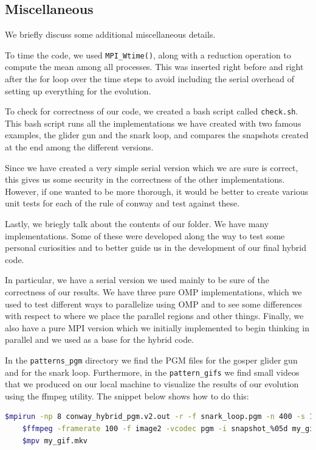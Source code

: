 \documentclass{report}
\begin{document}
\subsection{Miscellaneous}

We briefly discuss some additional miscellaneous details. 

To time the code, we used \texttt{MPI\_Wtime()}, along with a reduction 
operation to compute the mean among all processes. This was inserted right 
before and right after the for loop over the time steps to avoid including the 
serial overhead of setting up everything for the evolution. 

To check for correctness of our code, we created a bash script called 
\texttt{check.sh}. This bash script runs all the implementations we have created 
with two famous examples, the glider gun and the snark loop, and compares the 
snapshots created at the end among the different versions. 

Since we have created a very simple serial version which we are sure is correct, 
this gives us some security in the correctness of the other implementations. 
However, if one wanted to be more thorough, it would be better to create various 
unit tests for each of the rule of conway and test against these.

Lastly, we briegly talk about the contents of our folder. We have many implementations.
Some of these were developed along the way to test some personal curiosities and 
to better guide us in the development of our final hybrid code. 

In particular, we have a serial version we used mainly to be sure of the correctness 
of our results. We have three pure OMP implementations, which we used to test 
different ways to parallelize using OMP and to see some differences with respect 
to where we place the parallel regions and other things. Finally, we also have a 
pure MPI version which we initially implemented to begin thinking in parallel and 
we used as a base for the hybrid code. 

In the \texttt{patterns\_pgm} directory we find the PGM files for the gosper glider gun and 
for the snark loop. Furthermore, in the \texttt{pattern\_gifs} we find small videos 
that we produced on our local machine to visualize the results of our evolution 
using the ffmpeg utility. The snippet below shows how to do this: 

\begin{lstlisting}[language=bash]
    $mpirun -np 8 conway_hybrid_pgm.v2.out -r -f snark_loop.pgm -n 400 -s 1 -e 1 
    $ffmpeg -framerate 100 -f image2 -vcodec pgm -i snapshot_%05d my_gif.mkv
    $mpv my_gif.mkv
\end{lstlisting}
\end{document}
